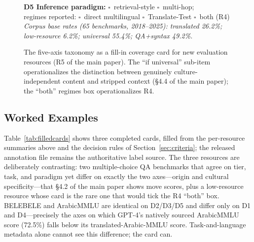 \documentclass[letterpaper]{article}
\begin{document}
\begin{figure}[t]
{\begin{minipage}{0.93\columnwidth}
\textbf{D5 Inference paradigm:} $\square$~retrieval-style $\square$~multi-hop;\\
\hspace*{6pt}regimes reported: $\square$~direct multilingual $\square$~Translate-Test $\square$~both (R4)\\[3pt]
\emph{Corpus base rates (65 benchmarks, 2018--2025): translated 26.2\%; low-resource 6.2\%; universal 55.4\%; QA+syntax 49.2\%.}
\end{minipage}}
\caption{The five-axis taxonomy as a fill-in coverage card for new evaluation resources (R5 of the main paper). The ``if universal'' sub-item operationalizes the distinction between genuinely culture-independent content and stripped context (\S4.4 of the main paper); the ``both'' regimes box operationalizes R4.}
\label{fig:card}
\end{figure}

\subsection{Worked Examples}
Table~\ref{tab:filledcards} shows three completed cards, filled from the per-resource summaries above and the decision rules of Section~\ref{sec:criteria}; the released annotation file remains the authoritative label source. The three resources are deliberately contrasting: two multiple-choice QA benchmarks that agree on tier, task, and paradigm yet differ on exactly the two axes---origin and cultural specificity---that \S4.2 of the main paper shows move scores, plus a low-resource resource whose card is the rare one that would tick the R4 ``both'' box. BELEBELE and ArabicMMLU are identical on D2/D3/D5 and differ only on D1 and D4---precisely the axes on which GPT-4's natively sourced ArabicMMLU score (72.5\%) falls below its translated-Arabic-MMLU score. Task-and-language metadata alone cannot see this difference; the card can.
\end{document}
